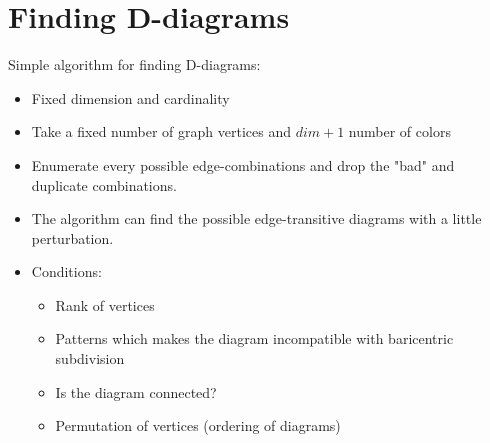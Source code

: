 \section{Finding D-diagrams}
\begin{frame}
  Simple algorithm for finding D-diagrams:
  \begin{itemize}
    \item Fixed dimension and cardinality
    \item Take a fixed number of graph vertices and $dim+1$ number of colors
    \item Enumerate every possible edge-combinations and drop the "bad" and
      duplicate combinations.
    \item The algorithm can find the possible edge-transitive diagrams with a
      little perturbation.
    \item Conditions:
      \begin{itemize}
	\item Rank of vertices
	\item Patterns which makes the diagram incompatible with baricentric
	  subdivision
	\item Is the diagram connected?
	\item Permutation of vertices (ordering of diagrams)
      \end{itemize}
  \end{itemize}
\end{frame}

